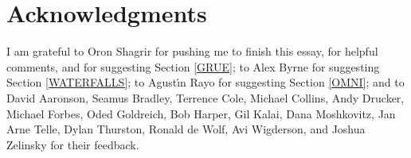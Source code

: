 \documentclass[11pt,onecolumn]{article}%
\begin{document}
\section{Acknowledgments}

I am grateful to Oron Shagrir for pushing me to finish this essay, for helpful
comments, and for suggesting Section \ref{GRUE}; to Alex Byrne for suggesting
Section \ref{WATERFALLS}; to Agust\'{\i}n Rayo for suggesting Section
\ref{OMNI}; and to David Aaronson, Seamus Bradley, Terrence Cole, Michael
Collins, Andy Drucker, Michael Forbes, Oded Goldreich, Bob Harper, Gil Kalai,
Dana Moshkovitz, Jan Arne Telle, Dylan Thurston, Ronald de Wolf, Avi
Wigderson, and Joshua Zelinsky for their feedback.



\end{document}
